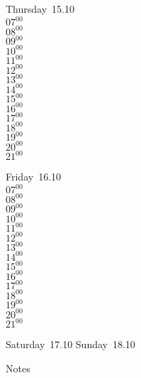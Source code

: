 \documentclass[11pt,a4paper]{book}\usepackage[]{graphicx}\usepackage[]{color}
\begin{document}
\clearpage
\begin{headerbox}
\end{headerbox}
\begin{weekdaybox}
  Thursday~15.10\\
  { 
  \vfill
  $07^{00}$\\
$08^{00}$\\
$09^{00}$\\
$10^{00}$\\
$11^{00}$\\
$12^{00}$\\
$13^{00}$\\
$14^{00}$\\
$15^{00}$\\
$16^{00}$\\
$17^{00}$\\
$18^{00}$\\
$19^{00}$\\
$20^{00}$\\
$21^{00}$\\
  }
\end{weekdaybox} 
\begin{weekdaybox}
  Friday~16.10\\
  { 
  \vfill
  $07^{00}$\\
$08^{00}$\\
$09^{00}$\\
$10^{00}$\\
$11^{00}$\\
$12^{00}$\\
$13^{00}$\\
$14^{00}$\\
$15^{00}$\\
$16^{00}$\\
$17^{00}$\\
$18^{00}$\\
$19^{00}$\\
$20^{00}$\\
$21^{00}$\\
  }
\end{weekdaybox}
\begin{weekendbox}
  Saturday~17.10
  \tcblower
  Sunday~18.10
\end{weekendbox} %
\begin{notebox}
  Notes
\end{notebox}
\clearpage
\end{document}

